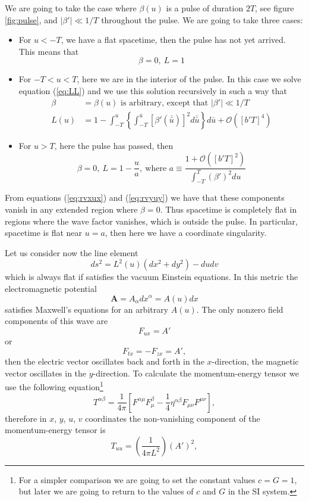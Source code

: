 We are going to take the case where $\beta\left(u\right)$ is a pulse
of duration $2T$, see figure \ref{fig:pulse}, and $\left|\beta'\right|\ll1/T$
throughout the pulse. We are going to take three cases:
\begin{itemize}
\item For $u<-T$, we have a flat spacetime, then the pulse has not yet
arrived. This means that
\[
\beta=0,\ L=1
\]
\item For $-T<u<T$, here we are in the interior of the pulse. In this case
we solve equation (\ref{eq:LL}) and we use this solution recursively
in such a way that
\begin{align*}
\beta & =\beta\left(u\right)\text{ is arbitrary, except that }\left|\beta'\right|\ll1/T\\
L\left(u\right) & =1-\int_{-T}^{u}\left\{ \int_{-T}^{\bar{u}}\left[\beta'\left(\bar{\bar{u}}\right)\right]^{2}d\bar{\bar{u}}\right\} d\bar{u}+\mathcal{O}\left(\left[b'T\right]^{4}\right)
\end{align*}
\item For $u>T$, here the pulse has passed, then
\[
\beta=0,\ L=1-\frac{u}{a},\ \text{where }a\equiv\frac{1+\mathcal{O}\left(\left[b'T\right]^{2}\right)}{\int_{-T}^{T}\left(\beta'\right)^{2}du}
\]
\end{itemize}
From equations (\ref{eq:rvxux}) and (\ref{eq:rvyuy}) we have that
these components vanish in any extended region where $\beta=0$. Thus
spacetime is completely flat in regions where the wave factor vanishes,
which is outside the pulse. In particular, spacetime is flat near
$u=a$, then here we have a coordinate singularity.

Let us consider now the line element
\[
ds^{2}=L^{2}\left(u\right)\left(dx^{2}+dy^{2}\right)-dudv
\]
which is always flat if satisfies the vacuum Einstein equations. In
this metric the electromagnetic potential
\[
\boldsymbol{A}=A_{\alpha}dx^{\alpha}=A\left(u\right)dx
\]
satisfies Maxwell's equations for an arbitrary $A\left(u\right)$.
The only nonzero field components of this wave are
\[
F_{ux}=A'
\]
or
\[
F_{tx}=-F_{zx}=A',
\]
then the electric vector oscillates back and forth in the $x$-direction,
the magnetic vector oscillates in the $y$-direction. To calculate
the momentum-energy tensor we use the following equation\footnote{For a simpler comparison we are going to set the constant values $c=G=1$,
but later we are going to return to the values of $c$ and $G$ in
the SI system.}
\[
T^{\alpha\beta}=\frac{1}{4\pi}\left[F^{\alpha\mu}F_{\mu}^{\beta}-\frac{1}{4}\eta^{\alpha\beta}F_{\mu\nu}F^{\mu\nu}\right],
\]
therefore in $x$, $y$, $u$, $v$ coordinates the non-vanishing
component of the momentum-energy tensor is
\[
T_{uu}=\left(\frac{1}{4\pi L^{2}}\right)\left(A'\right)^{2},
\]

